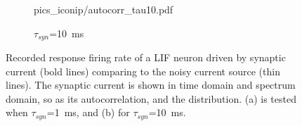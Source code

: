 \begin{figure}
\begin{subfigure}[c]{0.45\textwidth}
{			{pics_iconip/autocorr_tau10.pdf}}
		\caption{$\tau_{syn}$=10~ms}
	\end{subfigure}%
	\caption{Recorded response firing rate of a LIF neuron driven by synaptic current (bold lines) comparing to the noisy current source (thin lines). The synaptic current is shown in time domain and spectrum domain, so as its autocorrelation, and the distribution. (a) is tested when $\tau_{syn}$=1~ms, and (b) for $\tau_{syn}$=10~ms.}
	\label{Fig:lif_pois}
\end{figure}
	
